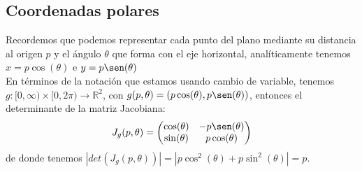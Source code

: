 \documentclass[10pt]{article}
\theoremstyle{definition}
\begin{document}
\subsection{Coordenadas polares}
Recordemos que podemos representar cada punto del plano mediante su distancia al origen $p$ y el ángulo $\theta$ que forma con el eje horizontal, analíticamente tenemos $x=p\cos(\theta)$ e $y=p\sen(\theta)$
    \\En términos de la notación que estamos usando cambio de variable, tenemos $g:[0,\infty)\times[0,2\pi)\to\mathbb{R}^2$, con $g(p,\theta)=(p\cos(\theta),p\sen(\theta))$, entonces el determinante de la matriz Jacobiana: $$J_g(p,\theta)=\begin{pmatrix} \cos(\theta) & -p\sen(\theta) \\ \sin(\theta) & p\cos(\theta) \end{pmatrix} $$
    de donde tenemos $|det(J_g(p,\theta))|=|p\cos^2(\theta)+p\sin^2(\theta)|=p$.
\end{document}
